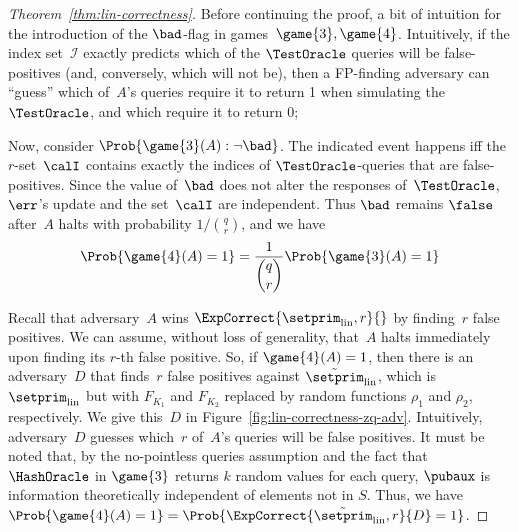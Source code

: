 \begin{proof}[Theorem~\ref{thm:lin-correctness}]
Before continuing the proof, a bit of intuition for the introduction
of the $\bad$-flag in games~$\game{3},\game{4}$.   Intuitively, if the index
set~$\mathcal{I}$ exactly predicts which of the $\TestOracle$ queries will be
false-positives (and, conversely, which will not be), then a
 FP-finding adversary can ``guess'' which of~$A$'s queries require it
to return 1 when simulating the $\TestOracle$, and which require it to return 0;

Now, consider $\Prob{\game{3}(A) : \neg\bad}$.  The indicated event
happens iff the $r$-set~$\calI$ contains exactly the indices of
$\TestOracle$-queries that are false-positives.  Since the value
of~$\bad$ does not alter the responses of~$\TestOracle$, $\err$'s update
and the set~$\calI$ are independent.
Thus $\bad$ remains $\false$ after~$A$ halts with probability
$1/\binom{q}{r}$, and we have 
\begin{equation*}
\Prob{\game{4}(A)=1} = \frac{1}{\dbinom{q}{r}}\Prob{\game{3}(A)=1}
\end{equation*}

Recall that adversary~$A$ wins $\ExpCorrect{\setprim_{\mathrm{lin}},r}{}$ by finding~$r$ false positives. We can assume, without loss of generality,  that~$A$ halts immediately upon finding its $r$-th false positive. %
%
So, if $\game{4}(A)=1$, then there is an adversary~$D$ that finds~$r$ false positives against $\tilde{\setprim}_{\mathrm{lin}}$, which is $\setprim_{\mathrm{lin}}$ but with $F_{K_1}$ and $F_{K_2}$ replaced by random functions $\rho_1$ and $\rho_2$, respectively.  We give this~$D$ in Figure~\ref{fig:lin-correctness-zq-adv}. Intuitively, adversary~$D$ guesses which~$r$ of~$A$'s queries will be false positives. It must be noted that, by the no-pointless queries assumption and the fact that $\HashOracle$ in $\game{3}$ returns $k$ random values for each query, $\pubaux$ is information theoretically independent of elements not in $S$. Thus, we have
$\Prob{\game{4}(A)=1} =\Prob{\ExpCorrect{\tilde{\setprim}_{\mathrm{lin}},r}{D} = 1}$.


\end{proof}
